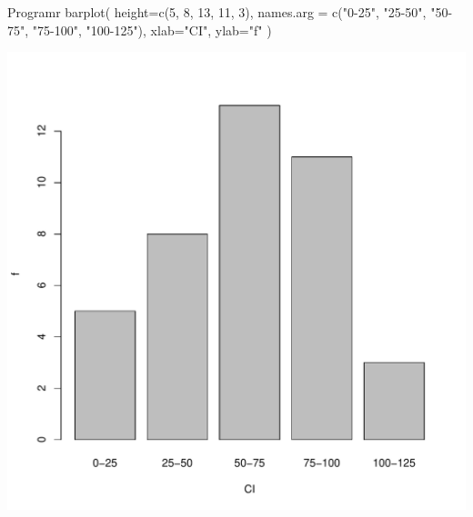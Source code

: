 \documentclass[11pt]{ipu-r}
\begin{document}
    \newpage
    \begin{code}
        {Program}{r}
barplot(
  height=c(5, 8, 13, 11, 3),
  names.arg = c("0-25", "25-50", "50-75", "75-100", "100-125"),
  xlab="CI",
  ylab="f"
)
    \end{code}
    \includegraphics[width=\linewidth]{figures/end-term-paper/q5}
\end{document}
